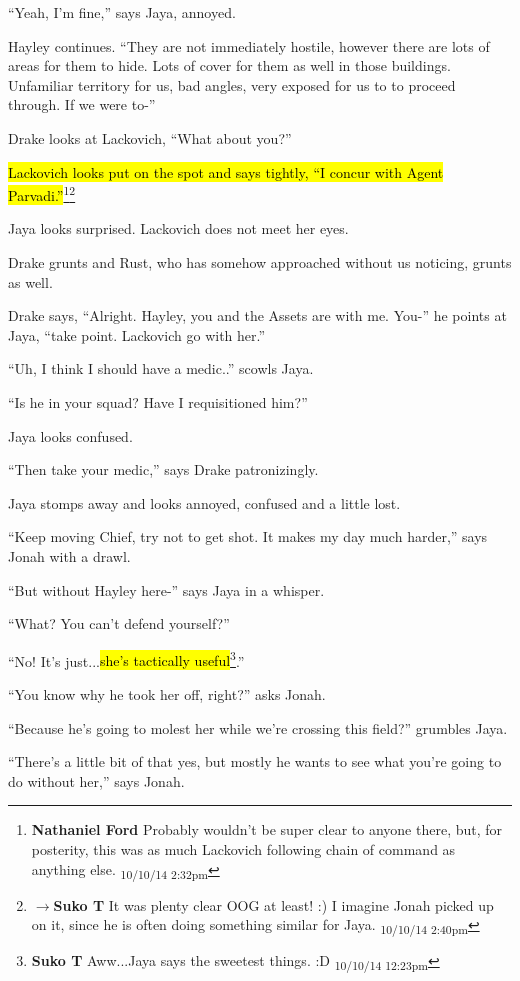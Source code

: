 ``Yeah, I'm fine,'' says Jaya, annoyed.

Hayley continues.  ``They are not immediately hostile, however there are lots of areas for them to hide.  Lots of cover for them as well in those buildings.  Unfamiliar territory for us, bad angles, very exposed for us to to proceed through.  If we were to-''

Drake looks at Lackovich, ``What about you?''

\hl{Lackovich looks put on the spot and says tightly, ``I concur with Agent Parvadi.''}\footnote{\textbf{Nathaniel Ford }Probably wouldn't be super clear to anyone there, but, for posterity, this was as much Lackovich following chain of command as anything else. \textsubscript{10/10/14 2:32pm}}\footnote{$\rightarrow$\textbf{Suko T }It was plenty clear OOG at least! :) I imagine Jonah picked up on it, since he is often doing something similar for Jaya. \textsubscript{10/10/14 2:40pm}}

Jaya looks surprised.  Lackovich does not meet her eyes.

Drake grunts and Rust, who has somehow approached without us noticing, grunts as well. 

Drake says, ``Alright.  Hayley, you and the Assets are with me.  You-'' he points at Jaya, ``take point.  Lackovich go with her.''

``Uh, I think I should have a medic..'' scowls Jaya.

``Is he in your squad?  Have I requisitioned him?''

Jaya looks confused.

``Then take your medic,'' says Drake patronizingly.

Jaya stomps away and looks annoyed, confused and a little lost.

``Keep moving Chief, try not to get shot.  It makes my day much harder,'' says Jonah with a drawl.

``But without Hayley here-'' says Jaya in a whisper.

``What?  You can't defend yourself?''

``No!  It's just...\hl{she's tactically useful}\footnote{\textbf{Suko T }Aww...Jaya says the sweetest things. :D \textsubscript{10/10/14 12:23pm}}.''

``You know why he took her off, right?'' asks Jonah.

``Because he's going to molest her while we're crossing this field?'' grumbles Jaya.

``There's a little bit of that yes, but mostly he wants to see what you're going to do without her,'' says Jonah.

